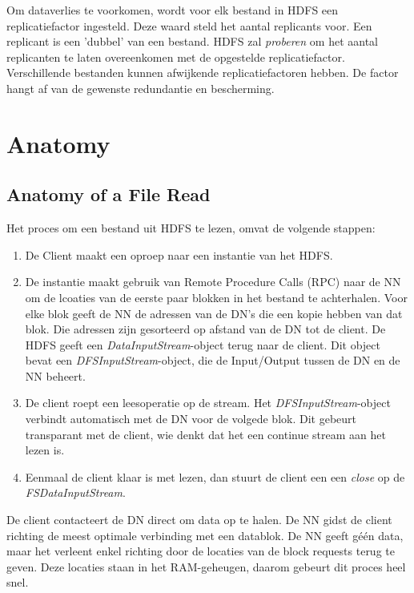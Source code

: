 \documentclass[a4paper,10pt,twoside]{report}
\begin{document}
Om dataverlies te voorkomen, wordt voor elk bestand in HDFS een replicatiefactor ingesteld. Deze waard steld het aantal replicants voor. Een replicant is een 'dubbel' van een bestand. HDFS zal \textit{proberen} om het aantal replicanten te laten overeenkomen met de opgestelde replicatiefactor. Verschillende bestanden kunnen afwijkende replicatiefactoren hebben. De factor hangt af van de gewenste redundantie en bescherming.

\section{Anatomy}

\subsection{Anatomy of a File Read}

Het proces om een bestand uit HDFS te lezen, omvat de volgende stappen:

\begin{enumerate}
	\item De Client maakt een oproep naar een instantie van het HDFS.
	\item De instantie maakt gebruik van Remote Procedure Calls (RPC) naar de NN om de lcoaties van de eerste paar blokken in het bestand te achterhalen. Voor elke blok geeft de NN de adressen van de DN's die een kopie hebben van dat blok. Die adressen zijn gesorteerd op afstand van de DN tot de client. De HDFS geeft een \textit{DataInputStream}-object terug naar de client. Dit object bevat een \textit{DFSInputStream}-object, die de Input/Output tussen de DN en de NN beheert.
	\item De client roept een leesoperatie op de stream. Het \textit{DFSInputStream}-object verbindt automatisch met de DN voor de volgede blok. Dit gebeurt transparant met de client, wie denkt dat het een continue stream aan het lezen is. 
	\item Eenmaal de client klaar is met lezen, dan stuurt de client een een \textit{close} op de \textit{FSDataInputStream}.
\end{enumerate}

De client contacteert de DN direct om data op te halen. De NN gidst de client richting de meest optimale verbinding met een datablok. De NN geeft géén data, maar het verleent enkel richting door de locaties van de block requests terug te geven. Deze locaties staan in het RAM-geheugen, daarom gebeurt dit proces heel snel.
\end{document}
